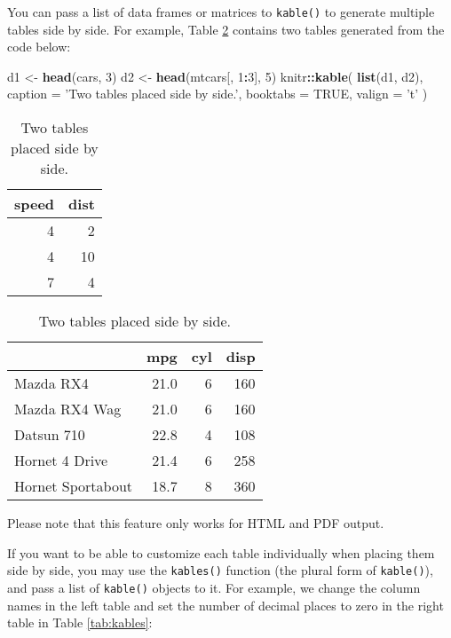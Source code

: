 \documentclass[
  11pt,
]{krantz}
\newenvironment{Shaded}{\begin{snugshade}}{\end{snugshade}}
\newcommand{\DataTypeTok}[1]{\textcolor[rgb]{0.27,0.27,0.27}{#1}}
\newcommand{\DecValTok}[1]{\textcolor[rgb]{0.06,0.06,0.06}{#1}}
\newcommand{\KeywordTok}[1]{\textcolor[rgb]{0.27,0.27,0.27}{\textbf{#1}}}
\newcommand{\NormalTok}[1]{#1}
\newcommand{\OperatorTok}[1]{\textcolor[rgb]{0.43,0.43,0.43}{\textbf{#1}}}
\newcommand{\OtherTok}[1]{\textcolor[rgb]{0.37,0.37,0.37}{#1}}
\newcommand{\StringTok}[1]{\textcolor[rgb]{0.5,0.5,0.5}{#1}}
\begin{document}
You can pass a list of data frames or matrices to \texttt{kable()} to generate multiple tables side by side. For example, Table \ref{tab:two-tables} contains two tables generated from the code below:

\begin{Shaded}
\begin{Highlighting}[]
\NormalTok{d1 <-}\StringTok{ }\KeywordTok{head}\NormalTok{(cars, }\DecValTok{3}\NormalTok{)}
\NormalTok{d2 <-}\StringTok{ }\KeywordTok{head}\NormalTok{(mtcars[, }\DecValTok{1}\OperatorTok{:}\DecValTok{3}\NormalTok{], }\DecValTok{5}\NormalTok{)}
\NormalTok{knitr}\OperatorTok{::}\KeywordTok{kable}\NormalTok{(}
  \KeywordTok{list}\NormalTok{(d1, d2),}
  \DataTypeTok{caption =} \StringTok{'Two tables placed side by side.'}\NormalTok{,}
  \DataTypeTok{booktabs =} \OtherTok{TRUE}\NormalTok{, }\DataTypeTok{valign =} \StringTok{'t'}
\NormalTok{)}
\end{Highlighting}
\end{Shaded}

\begin{table}
\caption{\label{tab:two-tables}Two tables placed side by side.}

\centering
\begin{tabular}[t]{rr}
\toprule
speed & dist\\
\midrule
4 & 2\\
4 & 10\\
7 & 4\\
\bottomrule
\end{tabular}
\centering
\begin{tabular}[t]{lrrr}
\toprule
  & mpg & cyl & disp\\
\midrule
Mazda RX4 & 21.0 & 6 & 160\\
Mazda RX4 Wag & 21.0 & 6 & 160\\
Datsun 710 & 22.8 & 4 & 108\\
Hornet 4 Drive & 21.4 & 6 & 258\\
Hornet Sportabout & 18.7 & 8 & 360\\
\bottomrule
\end{tabular}
\end{table}

Please note that this feature only works for HTML and PDF output.

If you want to be able to customize each table individually when placing them side by side, you may use the \texttt{kables()} function (the plural form of \texttt{kable()}), and pass a list of \texttt{kable()} objects to it. For example, we change the column names in the left table and set the number of decimal places to zero in the right table in Table \ref{tab:kables}:
\end{document}
